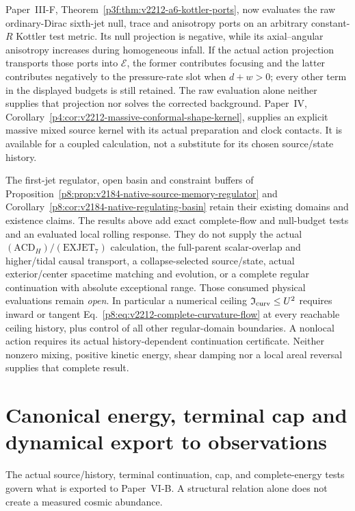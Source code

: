 \documentclass[12pt,a4paper]{article}
\begin{document}
\begin{remark}
\label{p8:rem:v2212-active-strong-field-status}
Paper~III-F,
Theorem~\ref{p3f:thm:v2212-a6-kottler-ports}, now evaluates the raw
ordinary-Dirac sixth-jet null, trace and anisotropy ports on an arbitrary
constant-$R$ Kottler test metric. Its null projection is negative, while
its axial--angular anisotropy increases during homogeneous infall.
If the actual action projection transports those ports into
$\mathcal E$, the former contributes focusing and the latter contributes
negatively to the pressure-rate slot when $d+w>0$; every other term in
the displayed budgets is still retained. The raw evaluation alone
neither supplies that projection nor solves the corrected background.
Paper~IV,
Corollary~\ref{p4:cor:v2212-massive-conformal-shape-kernel}, supplies an
explicit massive mixed source kernel with its actual preparation and
clock contacts. It is available for a coupled calculation, not a
substitute for its chosen source/state history.

The first-jet regulator, open basin and constraint buffers of
Proposition~\ref{p8:prop:v2184-native-source-memory-regulator} and
Corollary~\ref{p8:cor:v2184-native-regulating-basin} retain their existing
domains and existence claims. The results above add exact complete-flow
and null-budget tests and an evaluated local rolling response. They do
not supply the actual $(\mathrm{ACD}_H)/(\mathrm{EXJET}_7)$ calculation,
the full-parent scalar-overlap and higher/tidal causal transport, a
collapse-selected source/state, actual exterior/center spacetime matching
and evolution, or a complete
regular continuation with absolute exceptional range. Those consumed
physical evaluations remain \emph{open}. In particular a numerical
ceiling $\mathfrak I_{\rm curv}\le U^2$ requires inward or tangent
Eq.~\eqref{p8:eq:v2212-complete-curvature-flow} at every reachable
ceiling history, plus control of all other regular-domain boundaries.
A nonlocal action requires its actual history-dependent continuation
certificate. Neither nonzero mixing, positive kinetic energy, shear
damping nor a local areal reversal supplies that complete result.
\end{remark}



\section{Canonical energy, terminal cap and dynamical export to observations}
\label{p6a:sec:organized-a9}
The actual source/history, terminal continuation, cap, and complete-energy tests govern what is exported to Paper~VI-B. A structural relation alone does not create a measured cosmic abundance.
\end{document}
